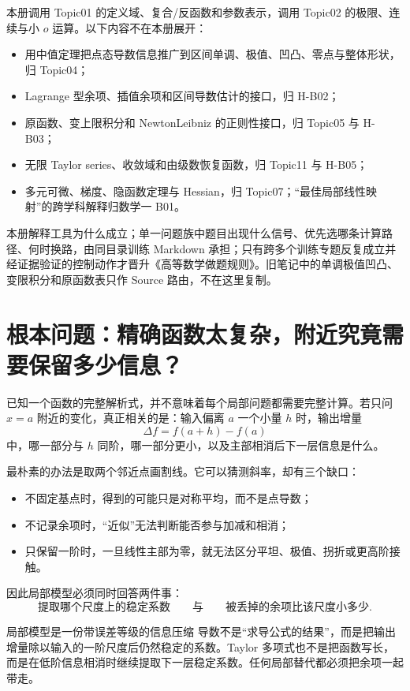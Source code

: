 \documentclass[11pt,a4paper]{ctexart}
\begin{document}
本册调用 Topic01 的定义域、复合/反函数和参数表示，调用 Topic02 的极限、连续与小 $o$ 运算。以下内容不在本册展开：
\begin{itemize}
  \item 用中值定理把点态导数信息推广到区间单调、极值、凹凸、零点与整体形状，归 Topic04；
  \item Lagrange 型余项、插值余项和区间导数估计的接口，归 H-B02；
  \item 原函数、变上限积分和 Newton\textendash{}Leibniz 的正则性接口，归 Topic05 与 H-B03；
  \item 无限 Taylor series、收敛域和由级数恢复函数，归 Topic11 与 H-B05；
  \item 多元可微、梯度、隐函数定理与 Hessian，归 Topic07；“最佳局部线性映射”的跨学科解释归数学一 B01。
\end{itemize}

本册解释工具为什么成立；单一问题族中题目出现什么信号、优先选哪条计算路径、何时换路，由同目录训练 Markdown 承担；只有跨多个训练专题反复成立并经证据验证的控制动作才晋升《高等数学做题规则》。旧笔记中的单调极值凹凸、变限积分和原函数表只作 Source 路由，不在这里复制。

\section{根本问题：精确函数太复杂，附近究竟需要保留多少信息？}

已知一个函数的完整解析式，并不意味着每个局部问题都需要完整计算。若只问 $x=a$ 附近的变化，真正相关的是：输入偏离 $a$ 一个小量 $h$ 时，输出增量
\[
\Delta f=f(a+h)-f(a)
\]
中，哪一部分与 $h$ 同阶，哪一部分更小，以及主部相消后下一层信息是什么。

最朴素的办法是取两个邻近点画割线。它可以猜测斜率，却有三个缺口：
\begin{itemize}
  \item 不固定基点时，得到的可能只是对称平均，而不是点导数；
  \item 不记录余项时，“近似”无法判断能否参与加减和相消；
  \item 只保留一阶时，一旦线性主部为零，就无法区分平坦、极值、拐折或更高阶接触。
\end{itemize}

因此局部模型必须同时回答两件事：
\[
\boxed{\text{提取哪个尺度上的稳定系数}}
\qquad\text{与}\qquad
\boxed{\text{被丢掉的余项比该尺度小多少}}.
\]

\begin{corebox}{局部模型是一份带误差等级的信息压缩}
导数不是“求导公式的结果”，而是把输出增量除以输入的一阶尺度后仍然稳定的系数。Taylor 多项式也不是把函数写长，而是在低阶信息相消时继续提取下一层稳定系数。任何局部替代都必须把余项一起带走。
\end{corebox}
\end{document}
